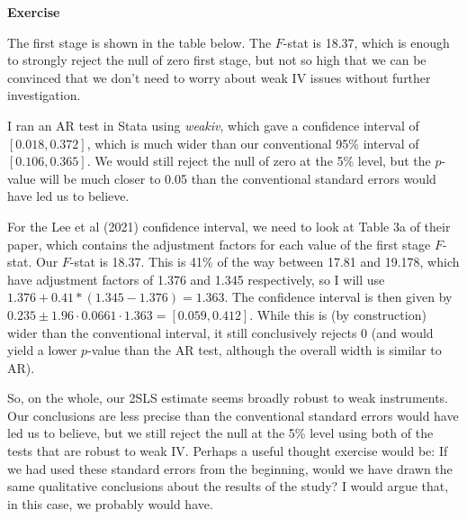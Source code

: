 \documentclass[10pt]{article}
\newcounter{exercise}
\newenvironment{exercise}%
{%
	\refstepcounter{exercise}%
	\textbf{Exercise \theexercise}%
	}%
{
 \par\vspace{\baselineskip}%
\noindent\ignorespacesafterend
}
\begin{document}
\begin{exercise}
\begin{enumerate}
	\color{red}
	
	The first stage is shown in the table below. The $F$-stat is 18.37, which is enough to strongly reject the null of zero first stage, but not so high that we can be convinced that we don't need to worry about weak IV issues without further investigation.
	
	I ran an AR test in Stata using \textit{weakiv}, which gave a confidence interval of $[0.018,0.372]$, which is much wider than our conventional 95\% interval of $[0.106,0.365]$. We would still reject the null of zero at the 5\% level, but the $p$-value will be much closer to 0.05 than the conventional standard errors would have led us to believe. 
	
	For the Lee et al (2021) confidence interval, we need to look at Table 3a of their paper, which contains the adjustment factors for each value of the first stage $F$-stat. Our $F$-stat is 18.37. This is 41\% of the way between 17.81 and 19.178, which have adjustment factors of 1.376 and 1.345 respectively, so I will use $1.376 + 0.41*(1.345-1.376) = 1.363$. The confidence interval is then given by $0.235 \pm 1.96 \cdot 0.0661 \cdot 1.363 = [0.059,0.412]$. While this is (by construction) wider than the conventional interval, it still conclusively rejects 0 (and would yield a lower $p$-value than the AR test, although the overall width is similar to AR). 
	
	So, on the whole, our 2SLS estimate seems broadly robust to weak instruments. Our conclusions are less precise than the conventional standard errors would have led us to believe, but we still reject the null at the 5\% level using both of the tests that are robust to weak IV. Perhaps a useful thought exercise would be: If we had used these standard errors from the beginning, would we have drawn the same qualitative conclusions about the results of the study? I would argue that, in this case, we probably would have. 
	
	
	
	\color{black}
	
	\end{enumerate}
\end{exercise}

\end{document}
